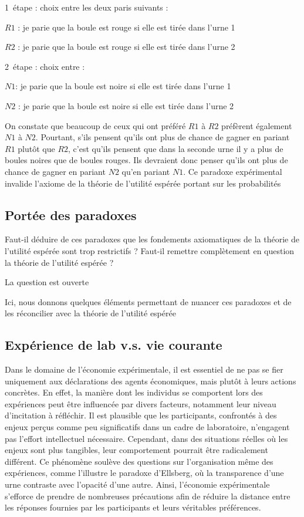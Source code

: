 \documentclass[a4paper, 12pt]{report}
\begin{document}
1\iere~étape : choix entre les deux paris suivants :

$R1$ : je parie que la boule est rouge si elle est tirée dans l'urne 1

$R2$ : je parie que la boule est rouge si elle est tirée dans l'urne 2

2\ieme~étape : choix entre :

$N1$: je parie que la boule est noire si elle est tirée dans l'urne 1

$N2$ : je parie que la boule est noire si elle est tirée dans l'urne 2

On constate que beaucoup de ceux qui ont préféré $R1$ à $R2$ préfèrent également $N1$ à $N2$. Pourtant, s'ils pensent qu'ils ont plus de chance de
gagner en pariant $R1$ plutôt que $R2$, c'est qu'ils pensent que dans la seconde urne il y a plus de boules noires que de boules rouges. Ils devraient donc penser qu'ils ont plus de chance de gagner en pariant $N2$ qu'en pariant $N1$. Ce paradoxe expérimental invalide l'axiome de la
théorie de l'utilité espérée portant sur les probabilités

\subsection{Portée des paradoxes}

Faut-il déduire de ces paradoxes que les fondements axiomatiques de la théorie de l'utilité espérée sont trop restrictifs ? Faut-il remettre complètement en question la théorie de l'utilité espérée ?

La question est ouverte

Ici, nous donnons quelques éléments permettant de nuancer ces paradoxes et de les réconcilier avec la théorie de l'utilité espérée

\subsection{Expérience de lab v.s. vie courante}

Dans le domaine de l'économie expérimentale, il est essentiel de ne pas se fier uniquement aux déclarations des agents économiques, mais plutôt à leurs actions concrètes. En effet, la manière dont les individus se comportent lors des expériences peut être influencée par divers facteurs, notamment leur niveau d'incitation à réfléchir. Il est plausible que les participants, confrontés à des enjeux perçus comme peu significatifs dans un cadre de laboratoire, n'engagent pas l'effort intellectuel nécessaire. Cependant, dans des situations réelles où les enjeux sont plus tangibles, leur comportement pourrait être radicalement différent. Ce phénomène soulève des questions sur l'organisation même des expériences, comme l'illustre le paradoxe d'Ellsberg, où la transparence d'une urne contraste avec l'opacité d'une autre. Ainsi, l'économie expérimentale s'efforce de prendre de nombreuses précautions afin de réduire la distance entre les réponses fournies par les participants et leurs véritables préférences.
\end{document}
